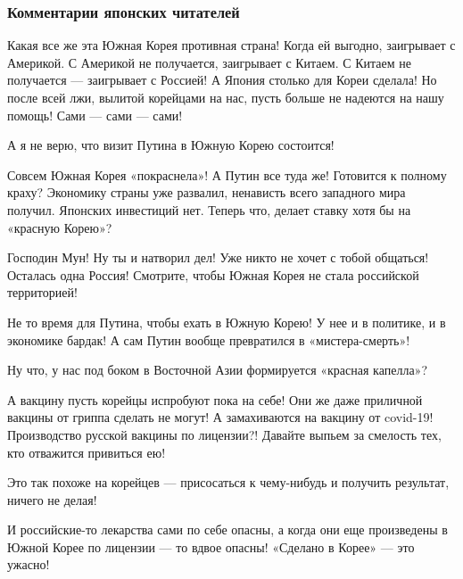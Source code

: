  
 
 
 
 
\subsubsection{Комментарии японских читателей}
\label{sec:29_12_2020.news.ru.inosmi.1.korea_sputnik_v_japan.comments}

\begin{itemize}

Какая все же эта Южная Корея противная страна! Когда ей выгодно, заигрывает с
Америкой. С Америкой не получается, заигрывает с Китаем. С Китаем не получается
— заигрывает с Россией! А Япония столько для Кореи сделала! Но после всей лжи,
вылитой корейцами на нас, пусть больше не надеются на нашу помощь! Сами — сами
— сами!


А я не верю, что визит Путина в Южную Корею состоится!


Совсем Южная Корея «покраснела»! А Путин все туда же! Готовится к полному
краху? Экономику страны уже развалил, ненависть всего западного мира получил.
Японских инвестиций нет. Теперь что, делает ставку хотя бы на «красную Корею»?


Господин Мун! Ну ты и натворил дел! Уже никто не хочет с тобой общаться!
Осталась одна Россия! Смотрите, чтобы Южная Корея не стала российской
территорией!


Не то время для Путина, чтобы ехать в Южную Корею! У нее и в политике, и в
экономике бардак! А сам Путин вообще превратился в «мистера-смерть»!


Ну что, у нас под боком в Восточной Азии формируется «красная капелла»?


А вакцину пусть корейцы испробуют пока на себе! Они же даже приличной вакцины
от гриппа сделать не могут! А замахиваются на вакцину от covid-19! Производство
русской вакцины по лицензии?! Давайте выпьем за смелость тех, кто отважится
привиться ею!


Это так похоже на корейцев — присосаться к чему-нибудь и получить результат,
ничего не делая!


И российские-то лекарства сами по себе опасны, а когда они еще произведены в
Южной Корее по лицензии — то вдвое опасны! «Сделано в Корее» — это ужасно!
\end{itemize}
